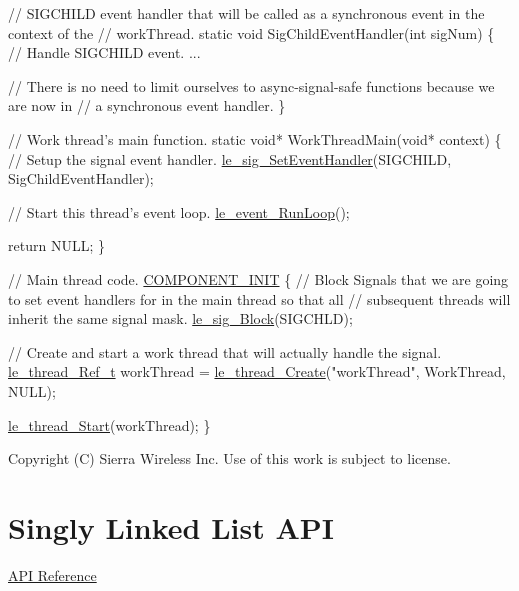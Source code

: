 \begin{DoxyCode}
\textcolor{comment}{// SIGCHILD event handler that will be called as a synchronous event in the context of the}
\textcolor{comment}{// workThread.}
\textcolor{keyword}{static} \textcolor{keywordtype}{void} SigChildEventHandler(\textcolor{keywordtype}{int} sigNum)
\{
     \textcolor{comment}{// Handle SIGCHILD event.}
     ...

     \textcolor{comment}{// There is no need to limit ourselves to async-signal-safe functions because we are now in}
     \textcolor{comment}{// a synchronous event handler.}
\}


\textcolor{comment}{// Work thread's main function.}
\textcolor{keyword}{static} \textcolor{keywordtype}{void}* WorkThreadMain(\textcolor{keywordtype}{void}* context)
\{
     \textcolor{comment}{// Setup the signal event handler.}
     \hyperlink{le__signals_8h_a421910132f193dae70e8309dc86a86c4}{le\_sig\_SetEventHandler}(SIGCHILD, SigChildEventHandler);

     \textcolor{comment}{// Start this thread's event loop.}
     \hyperlink{le__event_loop_8h_ae313b457994371c658be9fe0494a01ff}{le\_event\_RunLoop}();

     \textcolor{keywordflow}{return} NULL;
\}


\textcolor{comment}{// Main thread code.}
\hyperlink{le__event_loop_8h_abdb9187a56836a93d19cc793cbd4b7ec}{COMPONENT\_INIT}
\{
     \textcolor{comment}{// Block Signals that we are going to set event handlers for in the main thread so that all}
     \textcolor{comment}{// subsequent threads will inherit the same signal mask.}
     \hyperlink{le__signals_8h_a095ec12deab6b6ed0475583586a6c4d7}{le\_sig\_Block}(SIGCHLD);

     \textcolor{comment}{// Create and start a work thread that will actually handle the signal.}
     \hyperlink{le__thread_8h_a32121104c6b4ca39008eb79a4d6862f2}{le\_thread\_Ref\_t} workThread = \hyperlink{le__thread_8h_a87e02a46f92e9e3e11ed28a2b265872f}{le\_thread\_Create}(\textcolor{stringliteral}{"workThread"}, WorkThread,
       NULL);

     \hyperlink{le__thread_8h_a38df3877ee5ab9fac17b2fc0be46c27e}{le\_thread\_Start}(workThread);
\}
\end{DoxyCode}






Copyright (C) Sierra Wireless Inc. Use of this work is subject to license. \hypertarget{c_singlyLinkedList}{}\section{Singly Linked List A\+P\+I}\label{c_singlyLinkedList}
\hyperlink{le__singly_linked_list_8h}{A\+P\+I Reference}





